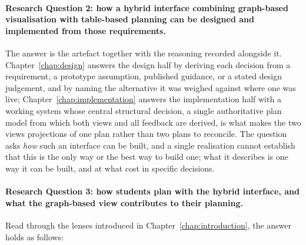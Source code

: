 \paragraph{Research Question 2: how a hybrid interface combining graph-based visualisation with table-based planning can be designed and implemented from those requirements.}
The answer is the artefact together with the reasoning recorded alongside it. Chapter~\ref{chap:design} answers the design half by deriving each decision from a requirement, a prototype assumption, published guidance, or a stated design judgement, and by naming the alternative it was weighed against where one was live; Chapter~\ref{chap:implementation} answers the implementation half with a working system whose central structural decision, a single authoritative plan model from which both views and all feedback are derived, is what makes the two views projections of one plan rather than two plans to reconcile. The question asks \emph{how} such an interface can be built, and a single realisation cannot establish that this is the only way or the best way to build one; what it describes is one way it can be built, and at what cost in specific decisions.

\paragraph{Research Question 3: how students plan with the hybrid interface, and what the graph-based view contributes to their planning.}
Read through the lenses introduced in Chapter~\ref{chap:introduction}, the answer holds as follows:

